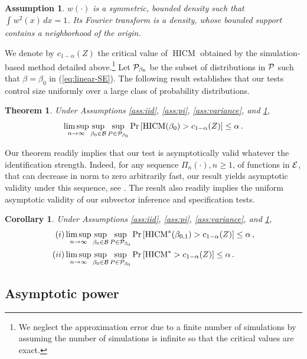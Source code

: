 \documentclass[12pt]{article}
\newcommand{\1}{\mathbf{1}}
\newcommand{\HICM}{\operatorname{HICM}}
\newcounter{thm}[section]
\newtheorem{theor}[thm]{Theorem}
\newtheorem{corollary}{Corollary}[section]
\newtheorem{hp}{Assumption}
\begin{document}
\begin{hp}
\label{ass:w}
 $w(\cdot)$ is a symmetric, bounded density  such
 that $\int_{}^{}{w^{2} (x)
 \, dx} = 1$.  Its Fourier transform is a density,
 whose bounded support contains a neighborhood of the origin.
 \end{hp}
We denote by $c_{1-\alpha} (Z)$  the  critical value of $\HICM$
obtained by the simulation-based method detailed above.\footnote{We neglect the
approximation error due to a finite number of simulations by assuming
the number of simulations is infinite so that the critical values are
exact.}
Let ${\cal P}_{\beta_{0}}$ be the subset of distributions in ${\cal
P}$ such that $\beta=\beta_{0}$ in (\ref{eq:linear-SE}).
 The following result establishes that our tests
control size uniformly over a large class of probability distributions.

\begin{theor} Under Assumptions \ref{ass:iid}, \ref{ass:pi},
\ref{ass:variance}, and \ref{ass:w},
\[
\limsup_{n\rightarrow \infty} \sup_{\beta_{0} \in {\cal B}}
\sup_{P \in {\cal P}_{\beta_{0}}}
\Pr\left[ \HICM (\beta_{0}) > c_{1-\alpha}(Z) \right] \leq
\alpha
\, .
\]
\label{th:level}
\end{theor}
Our theorem readily implies that our test is asymptotically valid
whatever the identification strength. Indeed, for any sequence
$\Pi_{n}(\cdot), n \geq 1$, of functions in ${\cal E}$, that can
decrease in norm to zero arbitrarily fast, our result yields
asymptotic validity under this sequence, see  \citet[Chap. 2.8]{vaart_weak_2000}.
The result also readily implies the uniform asymptotic validity of our
subvector inference and
specification tests.
\begin{corollary} Under Assumptions \ref{ass:iid}, \ref{ass:pi},
\ref{ass:variance}, and \ref{ass:w},
\begin{align*}
(i) &
\limsup_{n\rightarrow \infty} \sup_{\beta_{0}  \in {\cal B}}
\sup_{P \in {\cal P}_{\beta_{0}}}
\Pr\left[ \HICM^*(\beta_{0,1}) > c_{1-\alpha}(Z) \right]  \leq
\alpha
\, ,
\\
(ii) &
\limsup_{n\rightarrow \infty} \sup_{\beta_{0}  \in {\cal B}}
\sup_{P \in {\cal P}_{\beta_{0}}}
\Pr\left[ \HICM^* > c_{1-\alpha}(Z) \right]   \leq
\alpha
\, .
\end{align*}
\label{th:levelspec}
\end{corollary}

\subsection{Asymptotic power}
\end{document}
